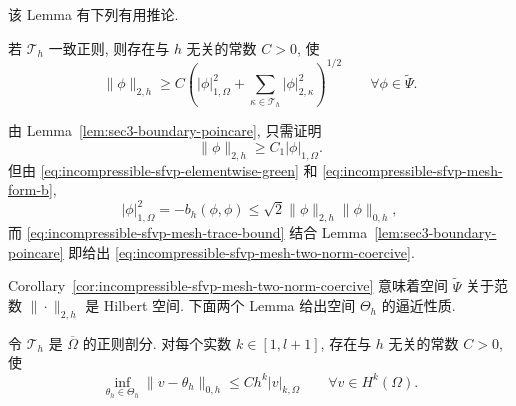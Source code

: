 该 Lemma 有下列有用推论.

\begin{Corollary}\label{cor:incompressible-sfvp-mesh-two-norm-coercive}
若 $\mathcal T_h$ 一致正则, 则存在与 $h$ 无关的常数 $C>0$, 使
\begin{equation}\label{eq:incompressible-sfvp-mesh-two-norm-coercive}
\|\phi\|_{2,h}
\geq C\left(
|\phi|_{1,\Omega}^2
+\sum_{\kappa\in\mathcal T_h}|\phi|_{2,\kappa}^2
\right)^{1/2}
\qquad\forall\phi\in\widetilde\Psi.
\end{equation}
\end{Corollary}

\begin{Proof}
由 Lemma~\ref{lem:sec3-boundary-poincare}, 只需证明
\[
\|\phi\|_{2,h}\geq C_1|\phi|_{1,\Omega}.
\]
但由 \eqref{eq:incompressible-sfvp-elementwise-green}
和 \eqref{eq:incompressible-sfvp-mesh-form-b},
\[
|\phi|_{1,\Omega}^2
=-b_h(\phi,\phi)
\leq\sqrt2\|\phi\|_{2,h}\|\phi\|_{0,h},
\]
而 \eqref{eq:incompressible-sfvp-mesh-trace-bound}
结合 Lemma~\ref{lem:sec3-boundary-poincare}
即给出 \eqref{eq:incompressible-sfvp-mesh-two-norm-coercive}.
\end{Proof}

Corollary~\ref{cor:incompressible-sfvp-mesh-two-norm-coercive}
意味着空间 $\widetilde\Psi$ 关于范数 $\|\cdot\|_{2,h}$ 是 Hilbert 空间.
下面两个 Lemma 给出空间 $\Theta_h$ 的逼近性质.

\begin{Lemma}\label{lem:incompressible-sfvp-mesh-zero-approximation}
令 $\mathcal T_h$ 是 $\overline\Omega$ 的正则剖分.
对每个实数 $k\in[1,l+1]$, 存在与 $h$ 无关的常数 $C>0$, 使
\begin{equation}\label{eq:incompressible-sfvp-mesh-zero-approximation}
\inf_{\theta_h\in\Theta_h}
\|v-\theta_h\|_{0,h}
\leq Ch^k|v|_{k,\Omega}
\qquad\forall v\in H^k(\Omega).
\end{equation}
\end{Lemma}

